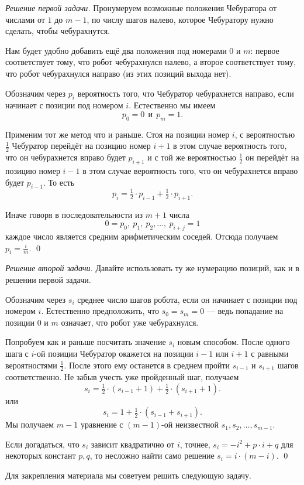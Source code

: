 \documentclass{article}
\begin{document}
\medskip
\noindent\textit{Решение первой задачи.}
Пронумеруем возможные положения Чебуратора от числами от $1$ до $m-1$,
по числу шагов налево, которое Чебуратору нужно сделать, чтобы чебурахнутся.

Нам будет удобно добавить ещё два положения под номерами $0$ и $m$:
первое соответствует тому, что робот чебурахнулся налево, 
а второе соответствует тому, что робот чебурахнулся направо
(из этих позиций выхода нет).


Обозначим через $p_i$ вероятность того, 
что Чебуратор чебурахнется направо,
если начинает с позиции под номером $i$.
Естественно мы имеем 
\[p_0=0\ \  \text{и}\ \  p_{m}=1.\]

Применим тот же метод что и раньше.
Стоя на позиции номер $i$,
с вероятностью $\tfrac12$ Чебуратор перейдёт на позицию номер $i+1$
в этом случае вероятность того, 
что он чебурахнется вправо будет $p_{i+1}$
и с той же вероятностью $\tfrac12$ он перейдёт на позицию номер $i-1$
в этом случае вероятность того, что он чебурахнется вправо будет $p_{i-1}$.
То есть 
\[p_i=\tfrac12\cdot p_{i-1}+\tfrac12\cdot p_{i+1}.\]

Иначе говоря в последовательности из $m+1$ числа
\[0=p_0,\ p_1,\ p_2,\dots,\ p_{i+j}=1\] 
каждое число является средним арифметическим 
соседей.
Отсюда получаем $p_i=\tfrac im$.
\qed

\medskip
\noindent\textit{Решение второй задачи.}
Давайте использовать ту же нумерацию позиций, как и в решении первой задачи.

Обозначим через $s_i$ среднее число шагов робота, если он начинает с позиции под номером $i$.
Естественно предположить, что $s_0=s_{m}=0$ ---
ведь попадание на позиции $0$ и $m$ означает, что робот уже чебурахнулся.

Попробуем как и раньше посчитать значение $s_i$ новым способом.
После одного шага с $i$-ой позиции
Чебуратор окажется на позиции $i-1$ или $i+1$ с равными вероятностями $\tfrac12$.
После этого ему останется в среднем пройти $s_{i-1}$ и $s_{i+1}$ шагов соответственно. 
Не забыв учесть уже пройденный шаг,
получаем
\[s_i=\tfrac12\cdot(s_{i-1}+1)+\tfrac12\cdot(s_{i+1}+1).\]
или 
\[s_i=1+\tfrac12\cdot(s_{i-1}+s_{i+1}).\]
Мы получаем $m-1$ уравнение с 
$(m-1)$-ой неизвестной
$s_1,s_2,\dots,s_{m-1}$.

Если догадаться,
что $s_i$ зависит квадратично от $i$,
точнее, $s_i=-i^2+p\cdot i +q$ для некоторых констант $p,q$,
то несложно найти само решение
$s_i=i\cdot(m-i)$.
\qed
\medskip

Для закрепления материала мы советуем решить следующую задачу.
\end{document}
